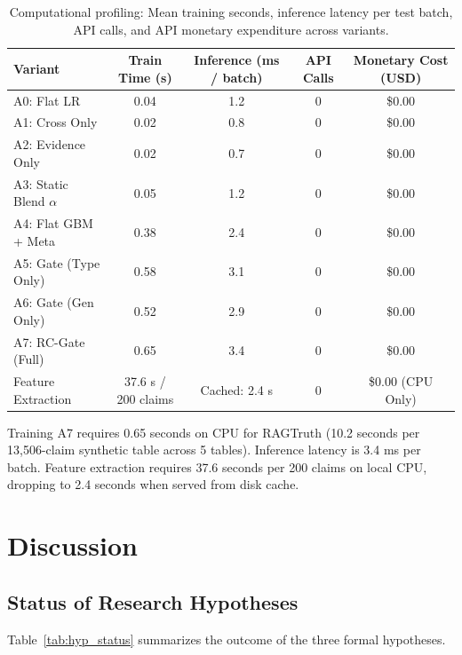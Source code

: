 \documentclass[pdflatex,sn-mathphys,Numbered]{sn-jnl}
\begin{document}
\begin{table}[htbp]
\caption{Computational profiling: Mean training seconds, inference latency per test batch, API calls, and API monetary expenditure across variants.}\label{tab:cost_profile}
\scriptsize
\setlength{\tabcolsep}{2.8pt}
\begin{tabular}{@{}lcccc@{}}
\toprule
\textbf{Variant} & \textbf{Train Time (s)} & \textbf{Inference (ms / batch)} & \textbf{API Calls} & \textbf{Monetary Cost (USD)} \\
\midrule
A0: Flat LR & 0.04 & 1.2 & 0 & \$0.00 \\
A1: Cross Only & 0.02 & 0.8 & 0 & \$0.00 \\
A2: Evidence Only & 0.02 & 0.7 & 0 & \$0.00 \\
A3: Static Blend $\alpha$ & 0.05 & 1.2 & 0 & \$0.00 \\
A4: Flat GBM + Meta & 0.38 & 2.4 & 0 & \$0.00 \\
A5: Gate (Type Only) & 0.58 & 3.1 & 0 & \$0.00 \\
A6: Gate (Gen Only) & 0.52 & 2.9 & 0 & \$0.00 \\
A7: RC-Gate (Full) & 0.65 & 3.4 & 0 & \$0.00 \\
\midrule
Feature Extraction & 37.6 s / 200 claims & Cached: 2.4 s & 0 & \$0.00 (CPU Only) \\
\bottomrule
\end{tabular}
\end{table}

Training A7 requires 0.65 seconds on CPU for RAGTruth (10.2 seconds per 13,506-claim synthetic table across 5 tables). Inference latency is 3.4 ms per batch. Feature extraction requires 37.6 seconds per 200 claims on local CPU, dropping to 2.4 seconds when served from disk cache.

\section{Discussion}\label{sec:discussion}

\subsection{Status of Research Hypotheses}\label{subsec:hyp_status}

Table~\ref{tab:hyp_status} summarizes the outcome of the three formal hypotheses.
\end{document}
